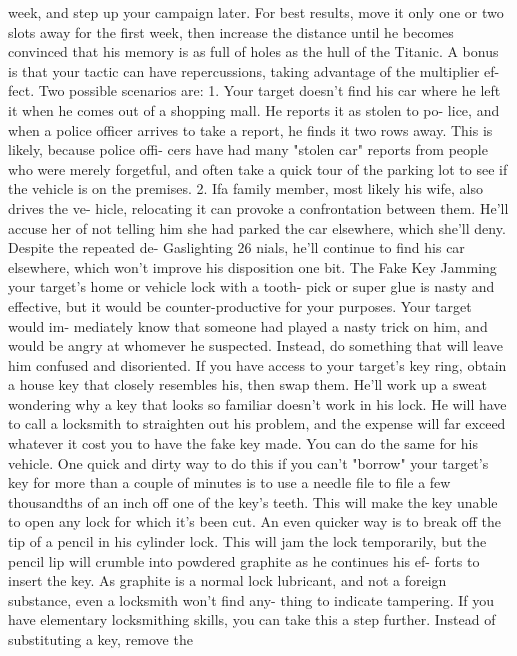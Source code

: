 \documentclass{book}
\begin{document}
week, and step up your campaign later. For best results, move it 
only one or two slots away for the first week, then increase the 
distance until he becomes convinced that his memory is as full 
of holes as the hull of the Titanic. A bonus is that your tactic 
can have repercussions, taking advantage of the multiplier ef- 
fect. Two possible scenarios are: 
1. Your target doesn't find his car where he left it when he 
comes out of a shopping mall. He reports it as stolen to po- 
lice, and when a police officer arrives to take a report, he 
finds it two rows away. This is likely, because police offi- 
cers have had many "stolen car" reports from people who 
were merely forgetful, and often take a quick tour of the 
parking lot to see if the vehicle is on the premises. 
2. Ifa family member, most likely his wife, also drives the ve- 
hicle, relocating it can provoke a confrontation between 
them. He'll accuse her of not telling him she had parked the 
car elsewhere, which she'll deny. Despite the repeated de-  Gaslighting 
26 
nials, he'll continue to find his car elsewhere, which won't 
improve his disposition one bit. 
The Fake Key 
Jamming your target's home or vehicle lock with a tooth- 
pick or super glue is nasty and effective, but it would be 
counter-productive for your purposes. Your target would im- 
mediately know that someone had played a nasty trick on him, 
and would be angry at whomever he suspected. Instead, do 
something that will leave him confused and disoriented. 
If you have access to your target's key ring, obtain a house 
key that closely resembles his, then swap them. He'll work up a 
sweat wondering why a key that looks so familiar doesn't work 
in his lock. He will have to call a locksmith to straighten out his 
problem, and the expense will far exceed whatever it cost you to 
have the fake key made. You can do the same for his vehicle. 
One quick and dirty way to do this if you can't "borrow" 
your target's key for more than a couple of minutes is to use a 
needle file to file a few thousandths of an inch off one of the 
key's teeth. This will make the key unable to open any lock for 
which it's been cut. 
An even quicker way is to break off the tip of a pencil in his 
cylinder lock. This will jam the lock temporarily, but the pencil 
lip will crumble into powdered graphite as he continues his ef- 
forts to insert the key. As graphite is a normal lock lubricant, 
and not a foreign substance, even a locksmith won't find any- 
thing to indicate tampering. 
If you have elementary locksmithing skills, you can take 
this a step further. Instead of substituting a key, remove the 
\end{document}

